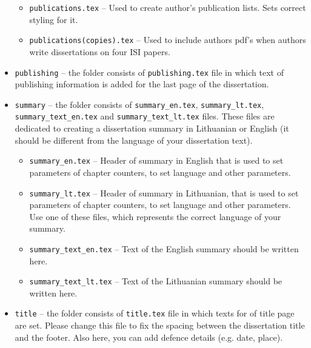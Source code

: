\begin{itemize}
\begin{itemize}
            \item \verb|publications.tex| -- Used to create author's publication lists. Sets correct styling for it.
            \item \verb|publications(copies).tex| -- Used to include authors pdf's when authors write dissertations on four ISI papers.
        \end{itemize}
    \item \verb|publishing| -- the folder consists of \verb|publishing.tex| file in which text of publishing information is added for the last page of the dissertation.
    \item \verb|summary| -- the folder consists of \verb|summary_en.tex|, \verb|summary_lt.tex|, \verb|summary_text_en.tex| and \verb|summary_text_lt.tex| files. These files are dedicated to creating a dissertation summary in Lithuanian or English (it should be different from the language of your dissertation text).
        \begin{itemize}
            \item \verb|summary_en.tex| -- Header of summary in English that is used to set parameters of chapter counters, to set language and other parameters.
            \item \verb|summary_lt.tex| -- Header of summary in Lithuanian, that is used to set parameters of chapter counters, to set language and other parameters. Use one of these files, which represents the correct language of your summary.
            \item \verb|summary_text_en.tex| -- Text of the English summary should be written here.
            \item \verb|summary_text_lt.tex| -- Text of the Lithuanian summary should be written here.
        \end{itemize}    
    \item \verb|title| -- the folder consists of \verb|title.tex| file in which texts for of title page are set. Please change this file to fix the spacing between the dissertation title and the footer. Also here, you can add defence details (e.g. date, place).
    
    
    
\end{itemize}


